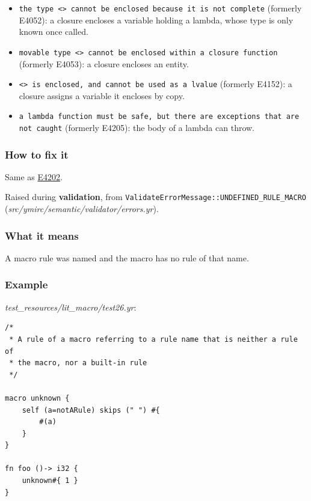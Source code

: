 \begin{itemize}
\item \texttt{the type \textless{}\textgreater{} cannot be enclosed because it is not complete} (formerly E4052): a closure encloses a variable holding a lambda, whose type is only known once called.
\item \texttt{movable type \textless{}\textgreater{} cannot be enclosed within a closure function} (formerly E4053): a closure encloses an entity.
\item \texttt{\textless{}\textgreater{} is enclosed, and cannot be used as a lvalue} (formerly E4152): a closure assigns a variable it encloses by copy.
\item \texttt{a lambda function must be safe, but there are exceptions that are not caught} (formerly E4205): the body of a lambda can throw.
\end{itemize}

\subsubsection*{How to fix it}

Same as \hyperref[sec:codes:e4202]{E4202}.

\label{sec:codes:e4234}

Raised during \textbf{validation}, from \texttt{ValidateErrorMessage::\allowbreak{}UNDEFINED\_\allowbreak{}RULE\_\allowbreak{}MACRO} (\textit{src/\allowbreak{}ymirc/\allowbreak{}semantic/\allowbreak{}validator/\allowbreak{}errors.yr}).

\subsubsection*{What it means}

A macro rule was named and the macro has no rule of that name.

\subsubsection*{Example}

\textit{test\_\allowbreak{}resources/\allowbreak{}lit\_\allowbreak{}macro/\allowbreak{}test26.yr}:

\begin{lstlisting}[style=coloredverbatimError]
/*
 * A rule of a macro referring to a rule name that is neither a rule of
 * the macro, nor a built-in rule
 */

macro unknown {
    self (a=notARule) skips (" ") #{
        #(a)
    }
}

fn foo ()-> i32 {
    unknown#{ 1 }
}
\end{lstlisting}

